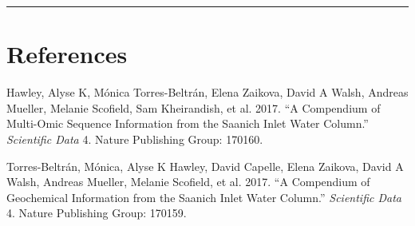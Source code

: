 \documentclass[11 pt,]{article}
\begin{document}
\begin{center}\rule{0.5\linewidth}{\linethickness}\end{center}

\section*{References}\label{references}

\hypertarget{refs}{}
\hypertarget{ref-Hawley2017:compendium}{}
Hawley, Alyse K, Mónica Torres-Beltrán, Elena Zaikova, David A Walsh,
Andreas Mueller, Melanie Scofield, Sam Kheirandish, et al. 2017. ``A
Compendium of Multi-Omic Sequence Information from the Saanich Inlet
Water Column.'' \emph{Scientific Data} 4. Nature Publishing Group:
170160.

\hypertarget{ref-Torres2017:compendium}{}
Torres-Beltrán, Mónica, Alyse K Hawley, David Capelle, Elena Zaikova,
David A Walsh, Andreas Mueller, Melanie Scofield, et al. 2017. ``A
Compendium of Geochemical Information from the Saanich Inlet Water
Column.'' \emph{Scientific Data} 4. Nature Publishing Group: 170159.
\end{document}
